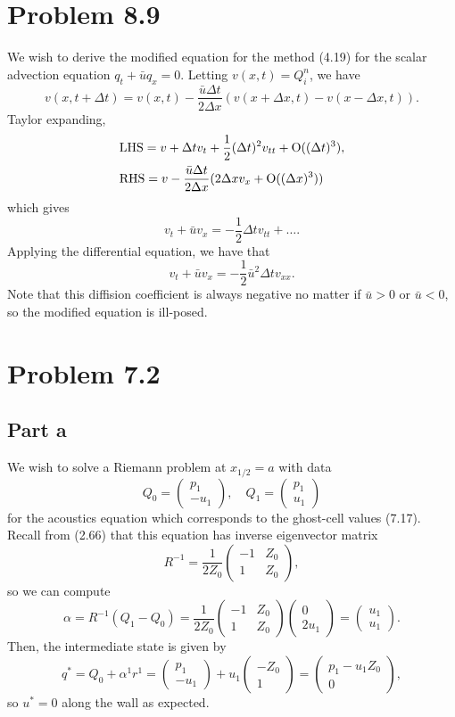 \documentclass{article}
\begin{document}
\section{Problem 8.9}
We wish to derive the modified equation for the method (4.19) for the scalar advection equation $q_t+\bar uq_x=0$. Letting $v(x,t)=Q^n_i$, we have 
\[
v(x,t+\Delta t)=v(x,t)-\frac{\bar u\Delta t}{2\Delta x}(v(x+\Delta x,t)-v(x-\Delta x,t)).
\]
Taylor expanding,
\begin{align*}
&\text{LHS}=v+\Delta tv_t+\frac{1}{2}(\Delta t)^2v_{tt}+\operatorname{O}((\Delta t)^3),\\
&\text{RHS}=v-\frac{\bar u\Delta t}{2\Delta x}(2\Delta xv_x+\operatorname{O}((\Delta x)^3))
\end{align*}
which gives
\[
v_t+\bar uv_x=-\frac{1}{2}\Delta tv_{tt}+\ldots.
\]
Applying the differential equation, we have that 
\[
v_t+\bar uv_x=-\frac{1}{2}\bar{u}^2\Delta tv_{xx}.
\]
Note that this diffision coefficient is always negative no matter if $\bar u>0$ or $\bar u<0$, so the modified equation is ill-posed.

\section{Problem 7.2}
\subsection{Part a}
We wish to solve a Riemann problem at $x_{1/2}=a$ with data 
\[
Q_0=\begin{pmatrix}
	p_1\\-u_1
\end{pmatrix},\quad Q_1=\begin{pmatrix}
p_1\\u_1
\end{pmatrix}
\]
for the acoustics equation which corresponds to the ghost-cell values (7.17). Recall from (2.66) that this equation has inverse eigenvector matrix 
\[
R^{-1}=\frac{1}{2Z_0}\begin{pmatrix}
	-1 &Z_0\\
	1&Z_0
\end{pmatrix},
\]
so we can compute
\[
\alpha=R^{-1}(Q_1-Q_0)=\frac{1}{2Z_0}\begin{pmatrix}
	-1 &Z_0\\
	1&Z_0
\end{pmatrix}\begin{pmatrix}
0\\2u_1
\end{pmatrix}=\begin{pmatrix}
u_1\\u_1
\end{pmatrix}.
\]
Then, the intermediate state is given by
\[
q^*=Q_0+\alpha^1r^1=\begin{pmatrix}
	p_1\\-u_1
\end{pmatrix}+u_1\begin{pmatrix}
-Z_0\\1
\end{pmatrix}=\begin{pmatrix}
p_1-u_1Z_0\\0
\end{pmatrix},
\]
so $u^*=0$ along the wall as expected.
\end{document}

